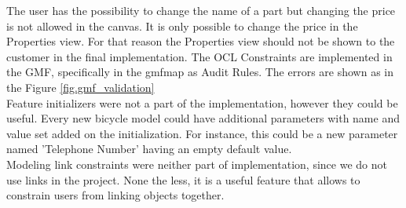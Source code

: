 \noindent The user has the possibility to change the name of a part but changing
the price is not allowed in the canvas. It is only possible to change the
price in the Properties view. For that reason the Properties view should not be
shown to the customer in the final implementation. The OCL Constraints are
implemented in the GMF, specifically in the gmfmap as Audit Rules. 
The errors are shown as in the Figure \ref{fig.gmf_validation}\\

\noindent Feature initializers were not a part of the implementation, however
they could be useful. Every new bicycle model could have additional parameters
with name and value set added on the initialization. For instance, this could be
a new parameter named 'Telephone Number' having an empty default value.\\
Modeling link constraints were neither part of implementation, since we do
not use links in the project. None the less, it is a useful feature that allows
to constrain users from linking objects together. \\

